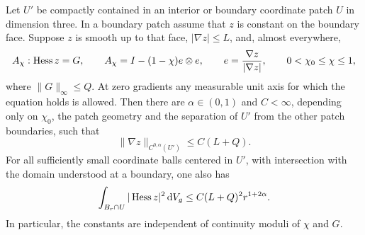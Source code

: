 \begin{lemma}\label{n3:existence:gradient}
Let $U'$ be compactly contained in an interior or boundary coordinate
patch $U$ in dimension three.  In a boundary patch assume that $z$ is
constant on the boundary face.  Suppose $z$ is smooth up to that face,
$|\nabla z|\le L$, and, almost everywhere,
\begin{equation}\label{n3:existence:axial-equation}
 A_\chi:\operatorname{Hess} z=G,\qquad
 A_\chi=I-(1-\chi)e\otimes e,\qquad
 e=\frac{\nabla z}{|\nabla z|},\qquad
 0<\chi_0\le\chi\le1,
\end{equation}
where $\|G\|_\infty\le Q$.  At zero gradients any measurable unit
axis for which the equation holds is allowed.  Then there are
$\alpha\in(0,1)$ and $C<\infty$, depending only on $\chi_0$, the
patch geometry and the separation of $U'$ from the other patch
boundaries, such that
\begin{equation}\label{n3:existence:gradient-estimate}
 \|\nabla z\|_{C^{0,\alpha}(U')}
 \le C(L+Q).
\end{equation}
For all sufficiently small coordinate balls centered in $U'$,
with intersection with the domain understood at a boundary, one also
has
\begin{equation}\label{n3:existence:hessian-morrey}
 \int_{B_r\cap U}|\operatorname{Hess} z|^2\,\mathrm d V_g
 \le C(L+Q)^2r^{1+2\alpha}.
\end{equation}
In particular, the constants are independent of continuity moduli of
$\chi$ and $G$.
\end{lemma}

